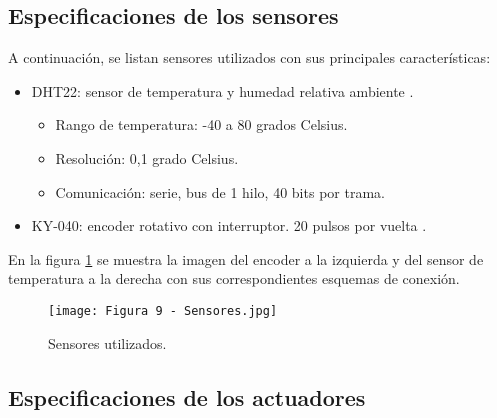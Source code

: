\subsection{Especificaciones de los sensores}

A continuación, se listan sensores utilizados con sus principales características:

\begin{itemize}
	\item DHT22: sensor de temperatura y humedad relativa ambiente \citep{33}.
	\begin{itemize}
		\item Rango de temperatura: -40 a 80 grados Celsius.
		\item Resolución: 0,1 grado Celsius.
		\item Comunicación: serie, bus de 1 hilo, 40 bits por trama.
	\end{itemize}
	\item KY-040: encoder rotativo con interruptor. 20 pulsos por vuelta \citep{34}.
\end{itemize}

En la figura \ref{fig:9} se muestra la imagen del encoder a la izquierda y del sensor de temperatura a la derecha con sus correspondientes esquemas de conexión.

\begin{figure}[h]
\centering
\texttt{[image: Figura 9 - Sensores.jpg]}
\caption[Sensores]{Sensores utilizados.}
\label{fig:9}
\end{figure}

\subsection{Especificaciones de los actuadores}

